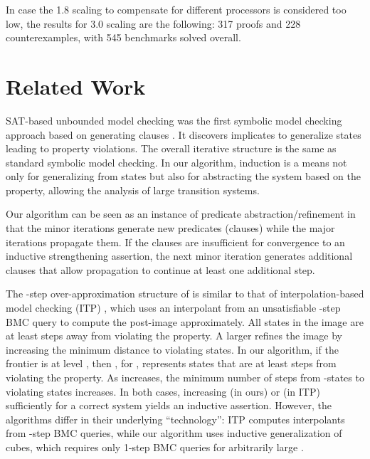 \documentclass{llncs}
\begin{document}
In case the 1.8 scaling to compensate for different processors is
considered too low, the results for 3.0 scaling are the following: 317
proofs and 228 counterexamples, with 545 benchmarks solved overall.

\section{Related Work}
\label{sec:related}



SAT-based unbounded model checking was the first symbolic model
checking approach based on generating clauses \cite{McMillan/2002}.
It discovers implicates to generalize states leading to property
violations.  The overall iterative structure is the same as standard
symbolic model checking.  In our algorithm, induction is a means not
only for generalizing from states but also for abstracting the system
based on the property, allowing the analysis of large transition
systems.



Our algorithm can be seen as an instance of predicate
abstraction/refinement \cite{Graf+Saidi/1997,Clarke+Others/2003} in
that the minor iterations generate new predicates (clauses) while the
major iterations propagate them.  If the clauses are insufficient for
convergence to an inductive strengthening assertion, the next minor
iteration generates additional clauses that allow propagation to
continue at least one additional step.



The -step over-approximation structure of  is similar to that of interpolation-based model checking
(ITP) \cite{McMillan/2003}, which uses an interpolant from an
unsatisfiable -step BMC query to compute the post-image
approximately.  All states in the image are at least  steps away
from violating the property.  A larger  refines the image by
increasing the minimum distance to violating states.  In our
algorithm, if the frontier is at level , then , for , represents states that are at least  steps from violating
the property.  As  increases, the minimum number of steps from
-states to violating states increases.  In both cases,
increasing  (in ours) or  (in ITP) sufficiently for a correct
system yields an inductive assertion.  However, the algorithms differ
in their underlying ``technology'': ITP computes interpolants from
-step BMC queries, while our algorithm uses inductive
generalization of cubes, which requires only 1-step BMC queries for
arbitrarily large .
\end{document}
